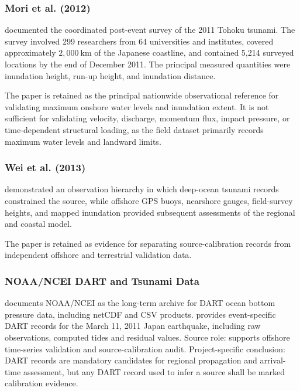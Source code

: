 %

\subsubsection{Mori et al. (2012)}
\label{sec:res-dat-obs-evidence-mori-2012}

\textcite{mori2012nationwide} documented the coordinated post-event survey of the 2011 Tohoku tsunami. The survey involved 299 researchers from 64 universities and institutes, covered approximately $2{,}000~\mathrm{km}$ of the Japanese coastline, and contained 5,214 surveyed locations by the end of December 2011. The principal measured quantities were inundation height, run-up height, and inundation distance.

The paper is retained as the principal nationwide observational reference for validating maximum onshore water levels and inundation extent. It is not sufficient for validating velocity, discharge, momentum flux, impact pressure, or time-dependent structural loading, as the field dataset primarily records maximum water levels and landward limits.

\subsubsection{Wei et al. (2013)}
\label{sec:res-dat-obs-evidence-wei-2013}

\textcite{wei2013japan} demonstrated an observation hierarchy in which
deep-ocean tsunami records constrained the source, while offshore GPS
buoys, nearshore gauges, field-survey heights, and mapped inundation
provided subsequent assessments of the regional and coastal model.

The paper is retained as evidence for separating source-calibration
records from independent offshore and terrestrial validation data.

\subsubsection{NOAA/NCEI DART and Tsunami Data}
\label{sec:res-dat-obs-evidence-noaa-ncei}

\textcite{noaa2005dart} documents NOAA/NCEI as the long-term archive
for DART ocean bottom pressure data, including netCDF and CSV products.
\textcite{noaa2011japanDart} provides event-specific DART records for
the March 11, 2011 Japan earthquake, including raw observations,
computed tides and residual values. Source role: supports offshore
time-series validation and source-calibration audit. Project-specific
conclusion: DART records are mandatory candidates for regional
propagation and arrival-time assessment, but any DART record used to
infer a source shall be marked calibration evidence.

